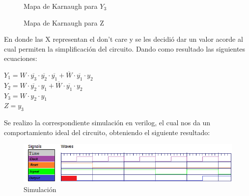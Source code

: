 \begin{center}
	\begin{figure}[h!]
		\begin{minipage}{0.5\textwidth}
			\caption{Mapa de Karnaugh para $Y_3$}
			\centering
			\begin{Karnaugh}
			\end{Karnaugh}
		\end{minipage}
		 \hspace{5mm}
		\begin{minipage}{0.5\textwidth}
			\caption{Mapa de Karnaugh para Z}
			\centering
			\begin{Karnaughvuit}
			\end{Karnaughvuit}
		\end{minipage}
	\end{figure}
\end{center}
En donde las X representan el don't care y se les decidió dar un valor acorde al cual permiten la simplificación del circuito. Dando como resultado las siguientes ecuaciones:\\
\begin{center}
	$Y_1 = W \cdot \overline{ y_3 } \cdot \overline{ y_2} \cdot \overline{ y_1 } + \overline{ W } \cdot \overline{ y_1} \cdot y_2  $\\
	$Y_2 = W \cdot \overline{ y_2} \cdot  y_1  + \overline{ W } \cdot \overline{ y_1} \cdot y_2  $\\
	$Y_3 = W \cdot  y_2 \cdot  y_1   $\\
	$Z = y_3  $\\
\end{center}
Se realizo la correspondiente simulación en verilog, el cual nos da un comportamiento ideal del circuito, obteniendo el siguiente resultado:\\
\FloatBarrier
\begin{figure}[h!]
	\centering
	\includegraphics[scale=0.8]{../Ejercicio-2/Simulacion_Moore.png}
	\caption{Simulación}
\end{figure}
\FloatBarrier
